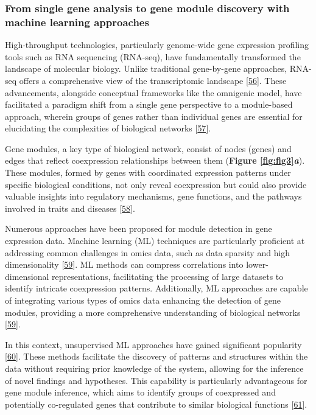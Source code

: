 \hypertarget{from-single-gene-analysis-to-gene-module-discovery-with-machine-learning-approaches}{%
\subsubsection{From single gene analysis to gene module discovery with machine learning approaches}\label{from-single-gene-analysis-to-gene-module-discovery-with-machine-learning-approaches}}

High-throughput technologies, particularly genome-wide gene expression profiling tools such as RNA sequencing (RNA-seq), have fundamentally transformed the landscape of molecular biology.
Unlike traditional gene-by-gene approaches, RNA-seq offers a comprehensive view of the transcriptomic landscape {[}\protect\hyperlink{ref-Zm8nV5AC}{56}{]}.
These advancements, alongside conceptual frameworks like the omnigenic model, have facilitated a paradigm shift from a single gene perspective to a module-based approach, wherein groups of genes rather than individual genes are essential for elucidating the complexities of biological networks {[}\protect\hyperlink{ref-SD886fuE}{57}{]}.

Gene modules, a key type of biological network, consist of nodes (genes) and edges that reflect coexpression relationships between them (\textbf{Figure \ref{fig:fig3}\emph{a}}).
These modules, formed by genes with coordinated expression patterns under specific biological conditions, not only reveal coexpression but could also provide valuable insights into regulatory mechanisms, gene functions, and the pathways involved in traits and diseases {[}\protect\hyperlink{ref-QUI8V4RY}{58}{]}.

Numerous approaches have been proposed for module detection in gene expression data.
Machine learning (ML) techniques are particularly proficient at addressing common challenges in omics data, such as data sparsity and high dimensionality {[}\protect\hyperlink{ref-K4KeL4gw}{59}{]}.
ML methods can compress correlations into lower-dimensional representations, facilitating the processing of large datasets to identify intricate coexpression patterns.
Additionally, ML approaches are capable of integrating various types of omics data enhancing the detection of gene modules, providing a more comprehensive understanding of biological networks {[}\protect\hyperlink{ref-K4KeL4gw}{59}{]}.

In this context, unsupervised ML approaches have gained significant popularity {[}\protect\hyperlink{ref-Ko8gMp8P}{60}{]}.
These methods facilitate the discovery of patterns and structures within the data without requiring prior knowledge of the system, allowing for the inference of novel findings and hypotheses.
This capability is particularly advantageous for gene module inference, which aims to identify groups of coexpressed and potentially co-regulated genes that contribute to similar biological functions {[}\protect\hyperlink{ref-1BVbSrr6M}{61}{]}.

